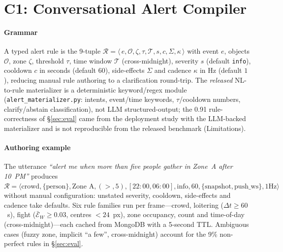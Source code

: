 ﻿\documentclass[conference]{IEEEtran}
\theoremstyle{plain}
\begin{document}
\section{C1: Conversational Alert Compiler}\label{sec:alert_grammar}

\paragraph*{Grammar}
A typed alert rule is the 9-tuple $\mathcal{R} = \langle\, e,\mathcal{O},\zeta,\tau,\mathcal{T},s,c,\Sigma,\kappa\,\rangle$ with event $e$, objects $\mathcal{O}$, zone $\zeta$, threshold $\tau$, time window $\mathcal{T}$ (cross-midnight), severity $s$ (default \texttt{info}), cooldown $c$ in seconds (default $60$), side-effects $\Sigma$ and cadence $\kappa$ in Hz (default $1$), reducing manual rule authoring to a clarification round-trip. The \emph{released} NL-to-rule materializer is a deterministic keyword/regex module (\texttt{alert\_\allowbreak materializer.py}: intents, event/time keywords, $\tau$/cooldown numbers, clarify/abstain classification), not LLM structured-output; the 0.91 rule-correctness of \S\ref{sec:eval} came from the deployment study with the LLM-backed materializer and is not reproducible from the released benchmark (Limitations).

\paragraph*{Authoring example}
The utterance \textit{``alert me when more than five people gather in Zone~A after 10~PM''} produces $\mathcal{R} = \langle\text{crowd},\{\text{person}\},\text{Zone~A},({>},5),[22{:}00,06{:}00],\allowbreak\text{info},60,\{\text{snapshot},\text{push\_ws}\},1\text{Hz}\rangle$
without manual configuration: unstated severity, cooldown, side-effects and cadence take defaults. Six rule families run per frame---crowd, loitering ($\Delta t{\ge}60$~s), fight ($\bar{\mathcal{E}}_W{\ge}0.03$, centres $<24$~px), zone occupancy, count and time-of-day (cross-midnight)---each cached from MongoDB with a 5-second TTL. Ambiguous cases (fuzzy zone, implicit ``a few'', cross-midnight) account for the 9\% non-perfect rules in \S\ref{sec:eval}.
\end{document}
